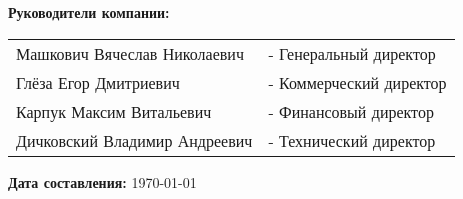 \begin{titlepage}
{\Large \textbf{Руководители компании:} \par}
\vspace{0.2cm}

\begin{tabular}{ll}
    Машкович Вячеслав Николаевич & - Генеральный директор \\
    Глёза Егор Дмитриевич & - Коммерческий директор \\
    Карпук Максим Витальевич & - Финансовый директор \\
    Дичковский Владимир Андреевич & - Технический директор \\
\end{tabular}
\vspace{1.5cm}

{\large \textbf{Дата составления:} \today \par}

\vfill
\end{titlepage}